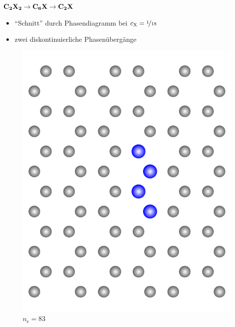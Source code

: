 \documentclass{beamer}
\def \nE {n_\mathrm{e}}
\def \cX {c_\mathrm{X}}
\begin{document}
\begin{frame}{$\bf C_{\boldsymbol 2}X_{\boldsymbol 2} \rightarrow C_{\boldsymbol 6}X \rightarrow C_{\boldsymbol 2}X$}
\begin{itemize}
			\item "`Schnitt"' durch Phasendiagramm bei $\cX = \nicefrac 1 {18}$
			\item zwei diskontinuierliche Phasenübergänge
		\end{itemize}
		\begin{figure}
			\scriptsize
			\begin{minipage}[b]{0.19\textwidth}
				\centering
				\includegraphics[height=1.1\textwidth]{Abbildungen/ne83.pdf} \\
				$\nE = 83$
			\end{minipage}
			\hfill
			\begin{minipage}[b]{0.19\textwidth}
				\centering

\end{minipage}
\end{figure}
\end{frame}
\end{document}
